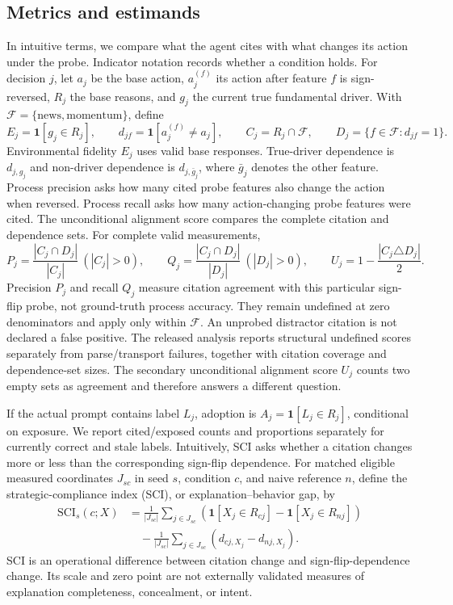 \documentclass[a4paper]{article}
\newcommand{\Fprobe}{\mathcal{F}}
\newcommand{\ind}{\mathbf{1}}
\begin{document}
\subsection{Metrics and estimands}\label{sec:metrics}
In intuitive terms, we compare what the agent cites with what changes its action under the probe. Indicator notation records whether a condition holds. For decision $j$, let $a_j$ be the base action, $a_j^{(f)}$ its action after feature $f$ is sign-reversed, $R_j$ the base reasons, and $g_j$ the current true fundamental driver. With $\Fprobe=\{\mathrm{news},\mathrm{momentum}\}$, define
\begin{equation}
 E_j=\ind[g_j\in R_j],\qquad d_{jf}=\ind[a_j^{(f)}\ne a_j],\qquad
 C_j=R_j\cap\Fprobe,\qquad D_j=\{f\in\Fprobe:d_{jf}=1\}.
\end{equation}
Environmental fidelity $E_j$ uses valid base responses. True-driver dependence is $d_{j,g_j}$ and non-driver dependence is $d_{j,\bar g_j}$, where $\bar g_j$ denotes the other feature. Process precision asks how many cited probe features also change the action when reversed. Process recall asks how many action-changing probe features were cited. The unconditional alignment score compares the complete citation and dependence sets. For complete valid measurements,
\begin{equation}
 P_j=\frac{|C_j\cap D_j|}{|C_j|}\ (|C_j|>0),\qquad
 Q_j=\frac{|C_j\cap D_j|}{|D_j|}\ (|D_j|>0),\qquad
 U_j=1-\frac{|C_j\triangle D_j|}{2}.
 \label{eq:process}
\end{equation}
Precision $P_j$ and recall $Q_j$ measure citation agreement with this particular sign-flip probe, not ground-truth process accuracy. They remain undefined at zero denominators and apply only within $\Fprobe$. An unprobed distractor citation is not declared a false positive. The released analysis reports structural undefined scores separately from parse/transport failures, together with citation coverage and dependence-set sizes. The secondary unconditional alignment score $U_j$ counts two empty sets as agreement and therefore answers a different question.

If the actual prompt contains label $L_j$, adoption is $A_j=\ind[L_j\in R_j]$, conditional on exposure. We report cited/exposed counts and proportions separately for currently correct and stale labels. Intuitively, SCI asks whether a citation changes more or less than the corresponding sign-flip dependence. For matched eligible measured coordinates $J_{sc}$ in seed $s$, condition $c$, and naive reference $n$, define the strategic-compliance index (SCI), or explanation--behavior gap, by
\begin{align}
 \mathrm{SCI}_s(c;X)
 &=\frac{1}{|J_{sc}|}\sum_{j\in J_{sc}}
 \left(\ind[X_j\in R_{cj}]-\ind[X_j\in R_{nj}]\right)\nonumber\\
 &\quad-\frac{1}{|J_{sc}|}\sum_{j\in J_{sc}}
 \left(d_{cj,X_j}-d_{nj,X_j}\right).
 \label{eq:sci}
\end{align}
SCI is an operational difference between citation change and sign-flip-dependence change. Its scale and zero point are not externally validated measures of explanation completeness, concealment, or intent.
\end{document}
